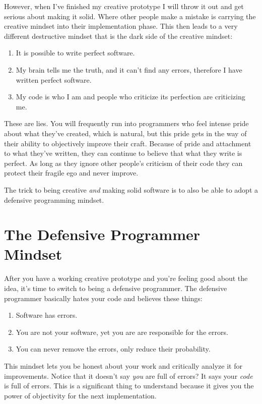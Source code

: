 However, when I've finished my creative prototype I will throw it out and 
get serious about making it solid.  Where other people make a mistake is
carrying the creative mindset into their implementation phase.  This
then leads to a very different destructive mindset that is the dark side
of the creative mindset:

\begin{enumerate}
\item It is possible to write perfect software.
\item My brain tells me the truth, and it can't find any errors, therefore I have written perfect software.
\item My code is who I am and people who criticize its perfection are criticizing me.
\end{enumerate}

These are lies.  You will frequently run into programmers who feel intense
pride about what they've created, which is natural, but this pride gets in the
way of their ability to objectively improve their craft.  Because of pride and
attachment to what they've written, they can continue to believe that what they
write is perfect.  As long as they ignore other people's criticism of their
code they can protect their fragile ego and never improve.

The trick to being creative \emph{and} making solid software is to 
also be able to adopt a defensive programming mindset.


\section{The Defensive Programmer Mindset}

After you have a working creative prototype and you're feeling good about the
idea, it's time to switch to being a defensive programmer.  The defensive
programmer basically hates your code and believes these things:

\begin{enumerate}
\item Software has errors.
\item You are not your software, yet you are are responsible for the errors.
\item You can never remove the errors, only reduce their probability.
\end{enumerate}

This mindset lets you be honest about your work and critically analyze it 
for improvements.  Notice that it doesn't say \emph{you} are full of errors?
It says your \emph{code} is full of errors.  This is a significant thing to
understand because it gives you the power of objectivity for the next
implementation.

